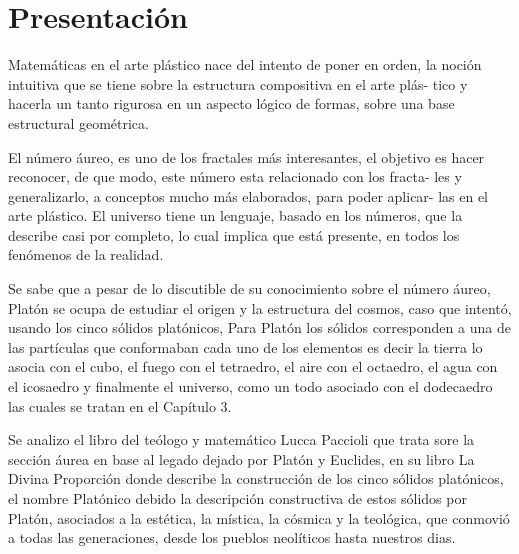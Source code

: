 \documentclass[a4paper]{book}
\begin{document}
  \renewcommand\listtablename{Lista de tablas}
  \listoftables
  \newpage

  \clearpage

  \chapter*{Presentación}


  Matemáticas en el arte plástico nace del intento de poner en orden, la
  noción intuitiva que se tiene sobre la estructura compositiva en el arte plás-
  tico y hacerla un tanto rigurosa en un aspecto lógico de formas, sobre una
  base estructural geométrica.

  El número áureo, es uno de los fractales más interesantes, el objetivo es
  hacer reconocer, de que modo, este número esta relacionado con los fracta-
  les y generalizarlo, a conceptos mucho más elaborados, para poder aplicar-
  las en el arte plástico. El universo tiene un lenguaje, basado en los números,
  que la describe casi por completo, lo cual implica que está presente, en todos
  los fenómenos de la realidad.

  Se sabe que a pesar de lo discutible de su conocimiento sobre el número
  áureo, Platón se ocupa de estudiar el origen y la estructura del cosmos,
  caso que intentó, usando los cinco sólidos platónicos, Para Platón los sólidos
  corresponden a una de las partículas que conformaban cada uno de los
  elementos es decir la tierra lo asocia con el cubo, el fuego con el tetraedro,
  el aire con el octaedro, el agua con el icosaedro y finalmente el universo,
  como un todo asociado con el dodecaedro las cuales se tratan en el Capítulo 3.

  Se analizo el libro del teólogo y matemático Lucca Paccioli que trata
  sore la sección áurea en base al legado dejado por Platón y Euclides, en
  su libro La Divina Proporción donde describe la construcción de los cinco
  sólidos platónicos, el nombre Platónico debido la descripción constructiva
  de estos sólidos por Platón, asociados a la estética, la mística, la cósmica
  y la teológica, que conmovió a todas las generaciones, desde los pueblos
  neolíticos hasta nuestros dias.
\end{document}
